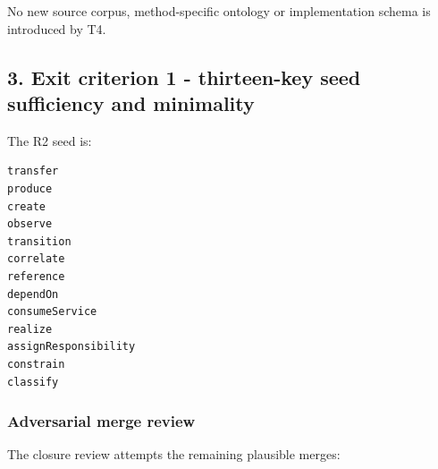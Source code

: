 \documentclass[11pt,a4paper]{article}
\begin{document}
No new source corpus, method-specific ontology or implementation schema is introduced by T4.

\subsection{3. Exit criterion 1 - thirteen-key seed sufficiency and minimality}\label{exit-criterion-1---thirteen-key-seed-sufficiency-and-minimality}

The R2 seed is:

\begin{verbatim}
transfer
produce
create
observe
transition
correlate
reference
dependOn
consumeService
realize
assignResponsibility
constrain
classify
\end{verbatim}

\subsubsection{Adversarial merge review}\label{adversarial-merge-review}

The closure review attempts the remaining plausible merges:
\end{document}

